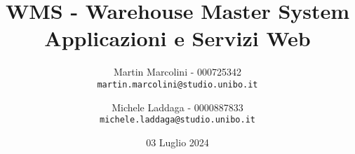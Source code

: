 \begin{titlepage}
    \title{\LARGE WMS - Warehouse Master System \\[10pt] \large Applicazioni e Servizi Web}
    \author{
        Martin Marcolini - 000725342 \\ \texttt{martin.marcolini@studio.unibo.it} \\[10pt]
        \and
        Michele Laddaga - 0000887833 \\ \texttt{michele.laddaga@studio.unibo.it}
    }
    \date{03 Luglio 2024}
    \maketitle
\end{titlepage}